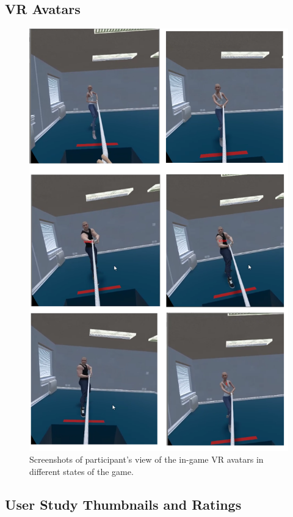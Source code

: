 \subsection{VR Avatars}
\label{subsection:vravatars}
\begin{figure}[H]
\includegraphics[width=\linewidth]{Images/avatars.png}
\caption{Screenshots of participant's view of the in-game VR avatars in different states of the game.}
\end{figure}

\clearpage
\subsection{User Study Thumbnails and Ratings}
\label{subsection:thumbnailsExperiment}
